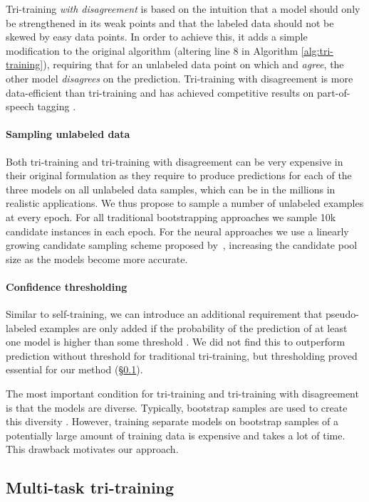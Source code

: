 \documentclass[11pt,a4paper]{article}
\begin{document}
Tri-training \textit{with disagreement} \cite{Sogaard2010} is based on the intuition that a model should only be strengthened in its weak points and that the labeled data should not be skewed by easy data points. In order to achieve this, it adds a simple modification to the original algorithm (altering line 8 in Algorithm \ref{alg:tri-training}), requiring that for an unlabeled data point on which  and  \emph{agree}, the other model  \emph{disagrees} on the prediction. Tri-training with disagreement is more data-efficient than tri-training and has achieved competitive results on part-of-speech tagging \cite{Sogaard2010}.

\paragraph{Sampling unlabeled data} Both tri-training and tri-training with disagreement can be very expensive in their original formulation as they require to produce predictions for each of the three models on all unlabeled data samples, which can be in the millions in realistic applications. We thus propose to sample a number of unlabeled examples at every epoch. For all traditional bootstrapping approaches we sample 10k candidate instances in each epoch. For the neural approaches we use a linearly growing candidate sampling scheme proposed by~\cite{Saito2017},  increasing the candidate pool size as the models become more accurate.

\paragraph{Confidence thresholding} Similar to self-training, we can introduce an additional requirement that pseudo-labeled examples are only added if the probability of the prediction of at least one model is higher than some threshold . We did not find this to outperform prediction without threshold for traditional tri-training, but thresholding proved essential for our method (\S \ref{sec:mt-tri}).

The most important condition for tri-training and tri-training with disagreement is that the models are diverse. Typically, bootstrap samples are used to create this diversity \cite{Zhou2005,Sogaard2010}. However, training separate models on bootstrap samples of a potentially large amount of training data is expensive and takes a lot of time. This drawback motivates our approach.

\subsection{Multi-task tri-training} \label{sec:mt-tri}
\end{document}
